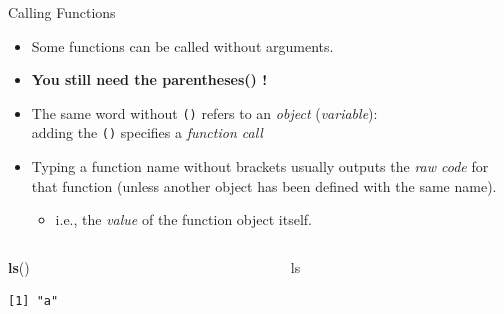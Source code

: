 \documentclass[
  11pt,
  ignorenonframetext,
]{beamer}
\newenvironment{Shaded}{\begin{snugshade}}{\end{snugshade}}
\newcommand{\AlertTok}[1]{\textcolor[rgb]{0.94,0.16,0.16}{#1}}
\newcommand{\FunctionTok}[1]{\textcolor[rgb]{0.13,0.29,0.53}{\textbf{#1}}}
\newcommand{\NormalTok}[1]{#1}
\providecommand{\tightlist}{%
  \setlength{\itemsep}{0pt}\setlength{\parskip}{0pt}}
\begin{document}
\begin{frame}[fragile]{Calling Functions}
\protect\hypertarget{calling-functions}{}
\begin{itemize}
\tightlist
\item
  Some functions can be called without arguments.
\item
  \textbf{You still need the parentheses\AlertTok{()} !}
\item
  The same word without \AlertTok{\texttt{()}} refers to an
  \emph{object} (\emph{variable}):\\
  adding the \AlertTok{\texttt{()}} specifies a \emph{function call}
\item
  Typing a function name without brackets usually outputs the \emph{raw
  code} for that function (unless another object has been defined with
  the same name).

  \begin{itemize}
  \tightlist
  \item
    i.e., the \emph{value} of the function object itself.
  \end{itemize}
\end{itemize}

\begin{columns}[T,onlytextwidth]
\begin{column}{0.48\textwidth}
\begin{Shaded}
\begin{Highlighting}[]
\FunctionTok{ls}\NormalTok{()}
\end{Highlighting}
\end{Shaded}

\begin{verbatim}
[1] "a"
\end{verbatim}
\end{column}

\begin{column}{0.48\textwidth}
\begin{Shaded}
\begin{Highlighting}[]
\NormalTok{ls}
\end{Highlighting}
\end{Shaded}


\end{column}
\end{columns}
\end{frame}
\end{document}
